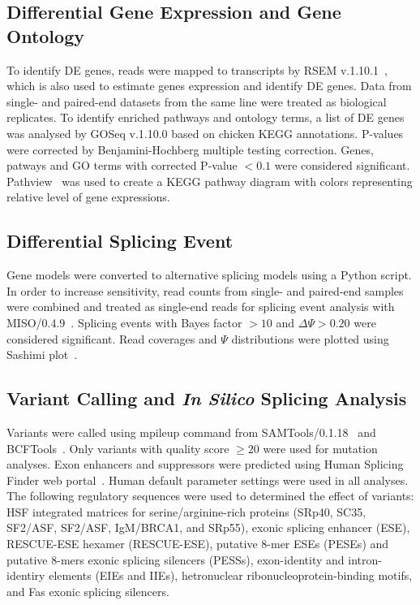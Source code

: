 \documentclass[10pt]{article}
\begin{document}
\subsection{Differential Gene Expression and Gene Ontology}

To identify DE genes, reads were mapped to transcripts by RSEM v.1.10.1~\cite{li2011rsem}, which is
also used to estimate genes expression and identify DE genes.
Data from single- and paired-end datasets from the same line were treated as biological replicates.
To identify enriched pathways and ontology terms, a list of DE genes was analysed by GOSeq v.1.10.0 based on
chicken KEGG annotations.
P-values were corrected by Benjamini-Hochberg multiple testing correction.
Genes, patways and GO terms with corrected P-value $<0.1$ were considered significant.
Pathview~\cite{luo2013pathview} was used to create a KEGG pathway diagram with colors representing relative level of gene expressions.

\subsection{Differential Splicing Event}
Gene models were converted to alternative splicing models using a Python script.
In order to increase sensitivity, read counts from single- and paired-end samples were combined and treated
as single-end reads for splicing event analysis with MISO/0.4.9~\cite{Katz:2010iv}.
Splicing events with Bayes factor $>10$ and $\Delta\Psi>0.20$ were considered significant.
Read coverages and $\Psi$ distributions were plotted using Sashimi plot~\cite{Katz:2013vx}.

\subsection{Variant Calling and \textit{In Silico} Splicing Analysis}
Variants were called using mpileup command from SAMTools/0.1.18~\cite{} and BCFTools~\cite{}.
Only variants with quality score $\ge20$ were used for mutation analyses.
Exon enhancers and suppressors were predicted using Human Splicing Finder web portal~\cite{}.
Human default parameter settings were used in all analyses.
The following regulatory sequences were used to determined the effect of variants:
HSF integrated matrices for serine/arginine-rich proteins (SRp40, SC35, SF2/ASF, SF2/ASF,
IgM/BRCA1, and SRp55), exonic splicing enhancer (ESE), RESCUE-ESE hexamer (RESCUE-ESE),
putative 8-mer ESEs (PESEs) and putative 8-mers exonic splicing silencers (PESSs),
exon-identity and intron-identiry elements (EIEs and IIEs), hetronuclear ribonucleoprotein-binding
motifs, and Fas exonic splicing silencers.
\end{document}
